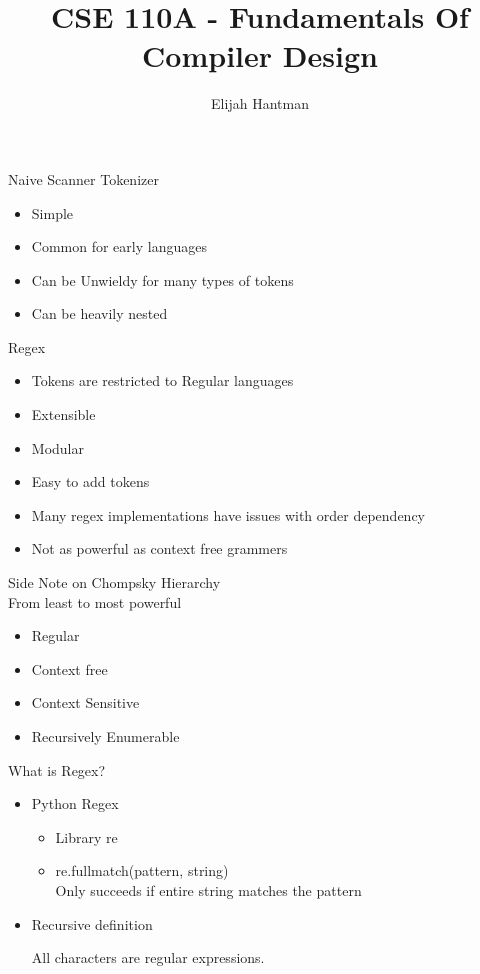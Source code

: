 \documentclass{report}
\title{\Huge{CSE 110A - Fundamentals Of Compiler Design}}
\author{\huge{Elijah Hantman}}
\date{}
\begin{document}
\maketitle
\newpage

\begin{description}
    \item Naive Scanner Tokenizer
        \begin{itemize}
            \item Simple
            \item Common for early languages
            \item Can be Unwieldy for many types of tokens 
            \item Can be heavily nested
        \end{itemize}
    \item Regex
        \begin{itemize}
            \item Tokens are restricted to Regular languages 
            \item Extensible
            \item Modular
            \item Easy to add tokens
            \item Many regex implementations have issues with
                order dependency
            \item Not as powerful as context free grammers
        \end{itemize}
    \item Side Note on Chompsky Hierarchy\\
        From least to most powerful
        \begin{itemize}
            \item Regular
            \item Context free
            \item Context Sensitive
            \item Recursively Enumerable
        \end{itemize}
    \item What is Regex?
        \begin{itemize}
            \item Python Regex
                \begin{itemize}
                    \item Library re
                    \item re.fullmatch(pattern, string)\\
                        Only succeeds if entire string
                        matches the pattern
                \end{itemize}
            \item Recursive definition
                \begin{mdframed}
                    All characters are regular expressions.


\end{mdframed}
\end{itemize}
\end{description}
\end{document}
